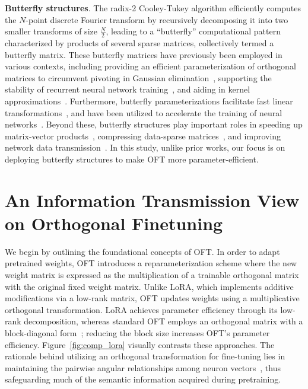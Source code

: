 \textbf{Butterfly structures}. The radix-2 Cooley-Tukey algorithm efficiently computes the $N$-point discrete Fourier transform by recursively decomposing it into two smaller transforms of size $\frac{N}{2}$, leading to a “butterfly” computational pattern characterized by products of several sparse matrices, collectively termed a butterfly matrix. These butterfly matrices have previously been employed in various contexts, including providing an efficient parameterization of orthogonal matrices to circumvent pivoting in Gaussian elimination~\cite{parker1995random}, supporting the stability of recurrent neural network training~\cite{jing2017tunable}, and aiding in kernel approximations~\cite{munkhoeva2018quadrature}. Furthermore, butterfly parameterizations facilitate fast linear transformations~\cite{dao2019learning,dao2019kaleidoscope}, and have been utilized to accelerate the training of neural networks~\cite{chen2022pixelated,dao2022monarch}. Beyond these, butterfly structures play important roles in speeding up matrix-vector products~\cite{michielssen1996multilevel,o2010algorithm}, compressing data-sparse matrices~\cite{li2015butterfly}, and improving network data transmission~\cite{klasing1994broadcasting,li2003linear,rajasingh2016transmission}. In this study, unlike prior works, our focus is on deploying butterfly structures to make OFT more parameter-efficient.

\section{An Information Transmission View on Orthogonal Finetuning}

We begin by outlining the foundational concepts of OFT. In order to adapt pretrained weights, OFT introduces a reparameterization scheme where the new weight matrix is expressed as the multiplication of a trainable orthogonal matrix with the original fixed weight matrix. Unlike LoRA, which implements additive modifications via a low-rank matrix, OFT updates weights using a multiplicative orthogonal transformation. LoRA achieves parameter efficiency through its low-rank decomposition, whereas standard OFT employs an orthogonal matrix with a block-diagonal form~\cite{qiu2023controlling}; reducing the block size increases OFT's parameter efficiency. Figure~\ref{fig:comp_lora} visually contrasts these approaches. The rationale behind utilizing an orthogonal transformation for fine-tuning lies in maintaining the pairwise angular relationships among neuron vectors~\cite{liu2018learning,liu2021orthogonal,qiu2023controlling}, thus safeguarding much of the semantic information acquired during pretraining.

